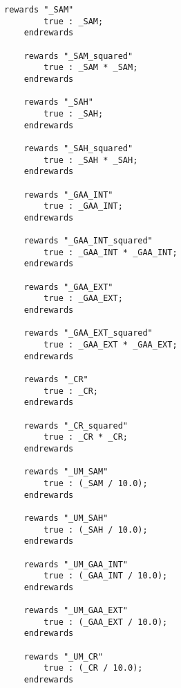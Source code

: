 \begin{lstlisting}[mathescape=true,language=prism]
	rewards "_SAM"
		true : _SAM;
	endrewards
	
	rewards "_SAM_squared"
		true : _SAM * _SAM;
	endrewards
	
	rewards "_SAH"
		true : _SAH;
	endrewards
	
	rewards "_SAH_squared"
		true : _SAH * _SAH;
	endrewards
	
	rewards "_GAA_INT"
		true : _GAA_INT;
	endrewards
	
	rewards "_GAA_INT_squared"
		true : _GAA_INT * _GAA_INT;
	endrewards
	
	rewards "_GAA_EXT"
		true : _GAA_EXT;
	endrewards
	
	rewards "_GAA_EXT_squared"
		true : _GAA_EXT * _GAA_EXT;
	endrewards
	
	rewards "_CR"
		true : _CR;
	endrewards
	
	rewards "_CR_squared"
		true : _CR * _CR;
	endrewards
	
	rewards "_UM_SAM"
		true : (_SAM / 10.0);
	endrewards
	
	rewards "_UM_SAH"
		true : (_SAH / 10.0);
	endrewards
	
	rewards "_UM_GAA_INT"
		true : (_GAA_INT / 10.0);
	endrewards
	
	rewards "_UM_GAA_EXT"
		true : (_GAA_EXT / 10.0);
	endrewards
	
	rewards "_UM_CR"
		true : (_CR / 10.0);
	endrewards\end{lstlisting}
